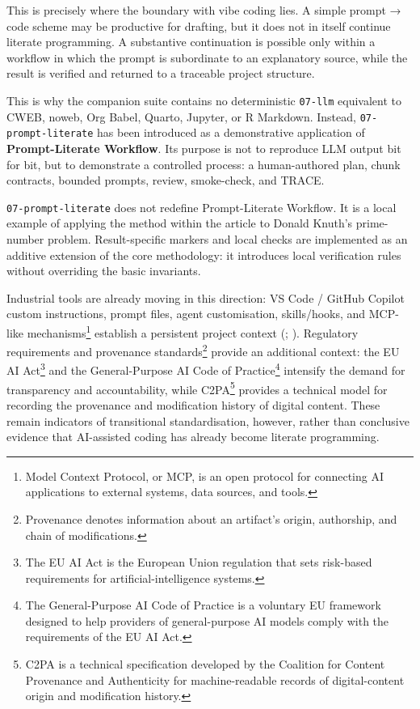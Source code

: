 \documentclass{ZGJournalArticle_2026}
\begin{document}
This is precisely where the boundary with vibe coding lies. A simple
prompt → code scheme may be productive for drafting, but it does not in
itself continue literate programming. A substantive continuation is
possible only within a workflow in which the prompt is subordinate to an
explanatory source, while the result is verified and returned to a
traceable project structure.

This is why the companion suite contains no deterministic
\texttt{07-llm} equivalent to CWEB, noweb, Org Babel, Quarto, Jupyter,
or R Markdown. Instead, \texttt{07-prompt-literate} has been introduced
as a demonstrative application of \textbf{Prompt-Literate Workflow}. Its
purpose is not to reproduce LLM output bit for bit, but to demonstrate a
controlled process: a human-authored plan, chunk contracts, bounded
prompts, review, smoke-check, and TRACE.

\texttt{07-prompt-literate} does not redefine Prompt-Literate Workflow.
It is a local example of applying the method within the article to
Donald Knuth's prime-number problem. Result-specific markers and local
checks are implemented as an additive extension of the core methodology:
it introduces local verification rules without overriding the basic
invariants.

Industrial tools are already moving in this direction: VS Code / GitHub
Copilot custom instructions, prompt files, agent customisation,
skills/hooks, and MCP-like mechanisms\footnote{Model Context Protocol,
  or MCP, is an open protocol for connecting AI applications to external
  systems, data sources, and tools.} establish a persistent project
context (;
). Regulatory requirements and provenance
standards\footnote{Provenance denotes information about an artifact's
  origin, authorship, and chain of modifications.} provide an additional
context: the EU AI Act\footnote{The EU AI Act is the European Union
  regulation that sets risk-based requirements for
  artificial-intelligence systems.} and the General-Purpose AI Code of
Practice\footnote{The General-Purpose AI Code of Practice is a voluntary
  EU framework designed to help providers of general-purpose AI models
  comply with the requirements of the EU AI Act.} intensify the demand
for transparency and accountability, while C2PA\footnote{C2PA is a
  technical specification developed by the Coalition for Content
  Provenance and Authenticity for machine-readable records of
  digital-content origin and modification history.} provides a technical
model for recording the provenance and modification history of digital
content. These remain indicators of transitional standardisation,
however, rather than conclusive evidence that AI-assisted coding has
already become literate programming.
\end{document}
